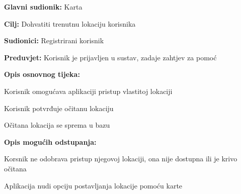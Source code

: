 \noindent {}
\begin{packed_item}
	\item \textbf{Glavni sudionik: } Karta
	\item  \textbf{Cilj:} Dohvatiti trenutnu lokaciju korisnika
	\item  \textbf{Sudionici:} Registrirani korisnik
	\item  \textbf{Preduvjet:} Korisnik je prijavljen u sustav, zadaje zahtjev za pomoć
	\item  \textbf{Opis osnovnog tijeka:}
	\item[] \begin{packed_enum}
		\item Korisnik omogućava aplikaciji pristup vlastitoj lokaciji
		\item Korisnik potvrđuje očitanu lokaciju
		\item Očitana lokacija se sprema u bazu
	\end{packed_enum}
	\item  \textbf{Opis mogućih odstupanja:}
	\item[] \begin{packed_item}
		\item[1.a] Korsnik ne odobrava pristup njegovoj lokaciji, ona nije dostupna ili je krivo očitana
		\item[] \begin{packed_enum}
			\item Aplikacija nudi opciju postavljanja lokacije pomoću karte
		\end{packed_enum}
	\end{packed_item}
\end{packed_item}

